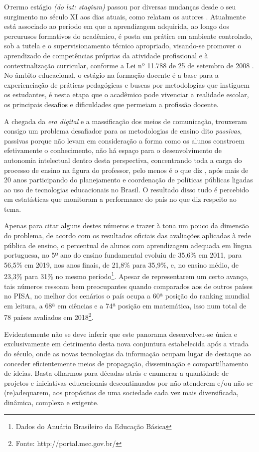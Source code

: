 \lettrine{O} termo estágio \textit{(do lat: stagium)} passou por diversas mudanças desde o seu surgimento no século XI aos dias atuais, como relatam os autores \cite{COLOMBO:2014}. Atualmente está associado ao período em que a aprendizagem  adquirida, ao longo dos percurusos formativos do acadêmico, é posta em prática em ambiente controlado, sob a tutela e o supervisionamento técnico apropriado, visando-se promover o aprendizado de competências próprias da atividade profissional e à contextualização curricular, conforme a Lei nº 11.788 de 25 de setembro de 2008 \cite{BRASIL:2008}. No âmbito educacional, o estágio na formação docente é a base para a experienciação de práticas pedagógicas e buscas por metodologias que instiguem os estudantes, é nesta etapa que o acadêmico pode vivenciar a realidade escolar, os principais desafios e dificuldades que permeiam a profissão docente.

A chegada da \textit{era digital} e a massificação dos meios de comunicação, trouxeram consigo um problema desafiador para as metodologias de ensino dito \textit{passivas}, passivas porque não levam em consideração a forma como os alunos constroem efetivamente o conhecimento, não há espaço para o desenvolvimento de autonomia intelectual dentro desta perspectiva, concentrando toda a carga do processo de ensino na figura do professor, pelo menos é o que diz , após mais de 20 anos participando do planejamento e coordenação de políticas públicas ligadas ao uso de tecnologias educacionais no Brasil. O resultado disso tudo é percebido em estatísticas que monitoram a performance do país no que diz respeito ao tema.

Apenas para citar alguns destes números e trazer à tona um pouco da dimensão do problema, de acordo com os resultados oficiais das avaliações aplicadas à rede pública de ensino, o percentual de alunos com aprendizagem adequada em língua portuguesa, no 5º ano do ensino fundamental evoluiu de 35,6\% em 2011, para 56,5\% em 2019, nos anos finais, de 21,8\% para 35,9\%, e, no ensino médio, de 23,3\% para 31\% no mesmo período\footnote{Dados do Anuário Brasileiro da Educação Básica}. Apesar de representarem um certo avanço, tais números ressoam bem preocupantes quando comparados aos de outros países no \ac{PISA}, no melhor dos cenários o país ocupa a 60ª posição do ranking mundial em leitura, a 68ª em ciências e a 74ª posição em matemática, isso num total de 78 países avaliados em 2018\footnote{Fonte: http://portal.mec.gov.br/}.

Evidentemente não se deve inferir que este panorama desenvolveu-se única e exclusivamente em detrimento desta nova conjuntura estabelecida após a virada do século, onde as novas tecnologias da informação ocupam lugar de destaque ao conceder eficientemente meios de propagação, disseminação e compartilhamento de ideias. Basta olharmos para décadas atrás e enumerar a quantidade de projetos e iniciativas educacionais descontinuados por não atenderem e/ou não se (re)adequarem, aos propósitos de uma sociedade cada vez mais diversificada, dinâmica, complexa e exigente. 

